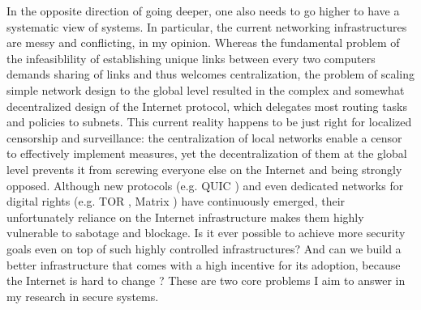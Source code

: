 \documentclass[10pt]{article}
\begin{document}
In the opposite direction of going deeper, one also needs to go higher to
have a systematic view of systems. In particular, the current networking
infrastructures are messy and conflicting, in my opinion. Whereas the
fundamental problem of the infeasiblility of establishing unique links between
every two computers demands sharing of links and thus welcomes centralization,
the problem of scaling simple network design to the global level resulted in
the complex and somewhat decentralized design of the Internet protocol, which
delegates most routing tasks and policies to subnets. This current reality
happens to be just right for localized censorship and surveillance: the
centralization of local networks enable a censor to effectively implement
measures, yet the decentralization of them at the global level prevents it from
screwing everyone else on the Internet and being strongly opposed. Although new
protocols (e.g. QUIC \cite{quic}) and even dedicated networks for digital
rights (e.g. TOR \cite{onion.routing, tor}, Matrix \cite{matrix}) have
continuously emerged, their unfortunately reliance on the Internet
infrastructure makes them highly vulnerable to sabotage and blockage. Is it
ever possible to achieve more security goals even on top of such highly
controlled infrastructures? And can we build a better infrastructure that comes
with a high incentive for its adoption, because the Internet is hard to change
\cite{why.internet.just.works}? These are two core problems I aim to answer in
my research in secure systems.
\end{document}
